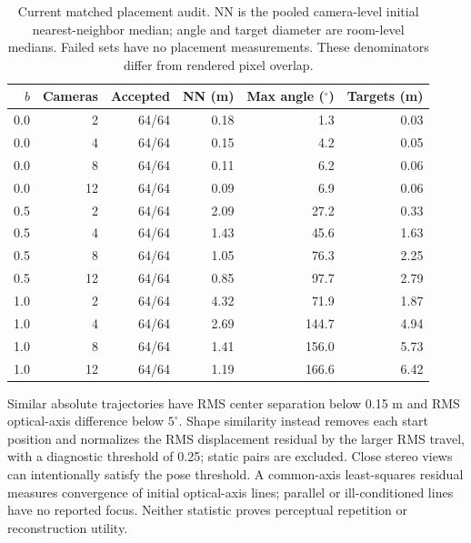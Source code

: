 \begin{table}[htbp]\centering\small
\begin{tabular}{rrrrrr}\toprule
$b$ & Cameras & Accepted & NN (m) & Max angle ($^\circ$) & Targets (m) \\
\midrule
0.0 & 2 & 64/64 & 0.18 & 1.3 & 0.03 \\
0.0 & 4 & 64/64 & 0.15 & 4.2 & 0.05 \\
0.0 & 8 & 64/64 & 0.11 & 6.2 & 0.06 \\
0.0 & 12 & 64/64 & 0.09 & 6.9 & 0.06 \\
0.5 & 2 & 64/64 & 2.09 & 27.2 & 0.33 \\
0.5 & 4 & 64/64 & 1.43 & 45.6 & 1.63 \\
0.5 & 8 & 64/64 & 1.05 & 76.3 & 2.25 \\
0.5 & 12 & 64/64 & 0.85 & 97.7 & 2.79 \\
1.0 & 2 & 64/64 & 4.32 & 71.9 & 1.87 \\
1.0 & 4 & 64/64 & 2.69 & 144.7 & 4.94 \\
1.0 & 8 & 64/64 & 1.41 & 156.0 & 5.73 \\
1.0 & 12 & 64/64 & 1.19 & 166.6 & 6.42 \\
\bottomrule\end{tabular}
\caption{Current matched placement audit. NN is the pooled camera-level initial nearest-neighbor median; angle and target diameter are room-level medians. Failed sets have no placement measurements. These denominators differ from rendered pixel overlap.}\label{tab:camera-counts}
\end{table}

Similar absolute trajectories have RMS center separation below 0.15 m and RMS optical-axis difference below $5^\circ$. Shape similarity instead removes each start position and normalizes the RMS displacement residual by the larger RMS travel, with a diagnostic threshold of 0.25; static pairs are excluded. Close stereo views can intentionally satisfy the pose threshold. A common-axis least-squares residual measures convergence of initial optical-axis lines; parallel or ill-conditioned lines have no reported focus. Neither statistic proves perceptual repetition or reconstruction utility.

